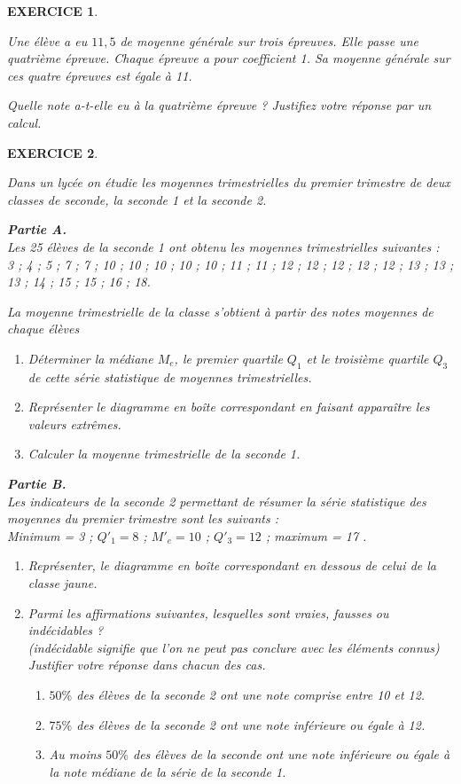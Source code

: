 \documentclass[a4paper]{article}   %
\renewcommand{\(}{\left(}
\renewcommand{\)}{\right)}
\newtheorem{EXO}{\large EXERCICE }
\newenvironment{EX}   { \setcounter{ques}{0} \begin{EXO} \hrulefill ~\vspace{0.3cm}

\normalfont}    {\end{EXO} \medskip}
\begin{document}
\begin{EX} Une élève a eu $11,5$ de moyenne générale sur trois épreuves. Elle passe une quatrième épreuve. Chaque épreuve a pour coefficient 1. Sa moyenne générale sur ces quatre épreuves est égale à 11. 

Quelle note a-t-elle eu à la quatrième épreuve ? Justifiez votre réponse par un calcul.
\end{EX}
\newpage \normalfont
\begin{EX}
Dans un lycée on étudie les moyennes trimestrielles du premier trimestre de deux
classes de seconde, la seconde 1 et la seconde 2. 

\textbf{Partie A.} \\

Les 25 élèves de la seconde 1 ont obtenu les moyennes trimestrielles suivantes : \\
3 ; 4 ; 5 ; 7 ; 7 ; 10 ; 10 ; 10 ; 10 ; 10 ; 11 ; 11 ; 12 ; 12 ; 12 ; 12 ; 12 ; 13 ; 13 ; 13 ; 14 ; 15 ; 15 ; 16 ; 18.

\medskip

La moyenne trimestrielle de la classe s'obtient à partir des notes moyennes de
chaque élèves
\begin{enumerate}
\item Déterminer la médiane $M_e$, le premier quartile $Q_1$ et le troisième quartile $Q_3$ de cette série statistique de moyennes trimestrielles.
\item Représenter le diagramme en boîte correspondant en faisant apparaître les valeurs extrêmes.
\item Calculer la moyenne trimestrielle de la seconde 1.
\end{enumerate} 

\textbf{Partie B.} \\
 
Les indicateurs de la seconde 2 permettant de résumer la série statistique des
moyennes du premier trimestre sont les suivants : \\
Minimum = 3 ; $Q′_1 = 8$ ; $M′_e = 10$ ; $Q′_3 = 12$ ; maximum = 17 .
\begin{enumerate}
\item  Représenter, le diagramme en boîte correspondant en dessous de celui de la
classe jaune.
\item Parmi les affirmations suivantes, lesquelles sont vraies, fausses ou indécidables ?\\
\textit{(indécidable signifie que l’on ne peut pas conclure avec les éléments connus)} \\
Justifier votre réponse dans chacun des cas. \begin{enumerate}
\item $50 \%$ des élèves de la seconde 2 ont une note comprise entre 10 et 12.
\item $75 \%$ des élèves de la seconde 2 ont une note inférieure ou égale à 12.
\item Au moins $50 \%$ des élèves de la seconde ont une note inférieure ou
égale à la note médiane de la série de la seconde 1.
\end{enumerate}\end{enumerate}
\end{EX}
\end{document}
